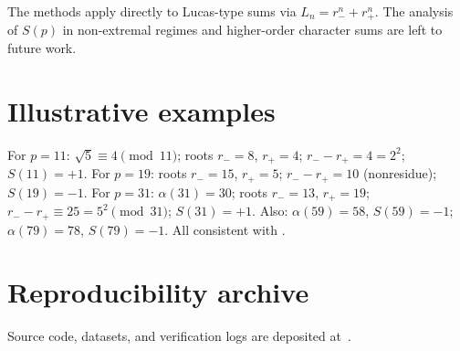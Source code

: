 \documentclass[preprint,5p,times,twocolumn]{elsarticle}
\begin{document}
The methods apply directly to Lucas-type sums via 
$L_n=r_-^n+r_+^n$. The analysis of $S(p)$ in non-extremal 
regimes and higher-order character sums are left to future work.

\appendix

\section{Illustrative examples}\label{app:examples}

For $p=11$: $\sqrt5\equiv4\pmod{11}$; roots $r_-=8$, $r_+=4$; 
$r_- - r_+=4=2^2$; $S(11)=+1$. \quad
For $p=19$: roots $r_-=15$, $r_+=5$; $r_- - r_+=10$ (nonresidue); 
$S(19)=-1$. \quad
For $p=31$: $\alpha(31)=30$; roots $r_-=13$, $r_+=19$; 
$r_- - r_+\equiv25=5^2\pmod{31}$; $S(31)=+1$. \quad
Also: $\alpha(59)=58$, $S(59)=-1$; $\alpha(79)=78$, $S(79)=-1$. 
All consistent with .

\section{Reproducibility archive}\label{app:software}

Source code, datasets, and verification logs are deposited 
at~\cite{Ghandali2026}.


\end{document}

